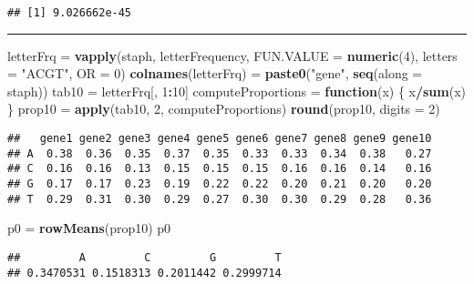 \documentclass[]{article}
\newenvironment{Shaded}{\begin{snugshade}}{\end{snugshade}}
\newcommand{\KeywordTok}[1]{\textcolor[rgb]{0.13,0.29,0.53}{\textbf{#1}}}
\newcommand{\DataTypeTok}[1]{\textcolor[rgb]{0.13,0.29,0.53}{#1}}
\newcommand{\DecValTok}[1]{\textcolor[rgb]{0.00,0.00,0.81}{#1}}
\newcommand{\StringTok}[1]{\textcolor[rgb]{0.31,0.60,0.02}{#1}}
\newcommand{\ControlFlowTok}[1]{\textcolor[rgb]{0.13,0.29,0.53}{\textbf{#1}}}
\newcommand{\OperatorTok}[1]{\textcolor[rgb]{0.81,0.36,0.00}{\textbf{#1}}}
\newcommand{\NormalTok}[1]{#1}
\begin{document}
\begin{verbatim}
## [1] 9.026662e-45
\end{verbatim}

\begin{center}\rule{0.5\linewidth}{\linethickness}\end{center}

\begin{Shaded}
\begin{Highlighting}[]
\NormalTok{letterFrq =}\StringTok{ }\KeywordTok{vapply}\NormalTok{(staph, letterFrequency, }\DataTypeTok{FUN.VALUE =} \KeywordTok{numeric}\NormalTok{(}\DecValTok{4}\NormalTok{),}
                   \DataTypeTok{letters =} \StringTok{"ACGT"}\NormalTok{, }\DataTypeTok{OR =} \DecValTok{0}\NormalTok{)}
\KeywordTok{colnames}\NormalTok{(letterFrq) =}\StringTok{ }\KeywordTok{paste0}\NormalTok{(}\StringTok{"gene"}\NormalTok{, }\KeywordTok{seq}\NormalTok{(}\DataTypeTok{along =}\NormalTok{ staph))}
\NormalTok{tab10 =}\StringTok{ }\NormalTok{letterFrq[, }\DecValTok{1}\OperatorTok{:}\DecValTok{10}\NormalTok{]}
\NormalTok{computeProportions =}\StringTok{ }\ControlFlowTok{function}\NormalTok{(x) \{ x}\OperatorTok{/}\KeywordTok{sum}\NormalTok{(x) \}}
\NormalTok{prop10 =}\StringTok{ }\KeywordTok{apply}\NormalTok{(tab10, }\DecValTok{2}\NormalTok{, computeProportions)}
\KeywordTok{round}\NormalTok{(prop10, }\DataTypeTok{digits =} \DecValTok{2}\NormalTok{)}
\end{Highlighting}
\end{Shaded}

\begin{verbatim}
##   gene1 gene2 gene3 gene4 gene5 gene6 gene7 gene8 gene9 gene10
## A  0.38  0.36  0.35  0.37  0.35  0.33  0.33  0.34  0.38   0.27
## C  0.16  0.16  0.13  0.15  0.15  0.15  0.16  0.16  0.14   0.16
## G  0.17  0.17  0.23  0.19  0.22  0.22  0.20  0.21  0.20   0.20
## T  0.29  0.31  0.30  0.29  0.27  0.30  0.30  0.29  0.28   0.36
\end{verbatim}

\begin{Shaded}
\begin{Highlighting}[]
\NormalTok{p0 =}\StringTok{ }\KeywordTok{rowMeans}\NormalTok{(prop10)}
\NormalTok{p0}
\end{Highlighting}
\end{Shaded}

\begin{verbatim}
##         A         C         G         T 
## 0.3470531 0.1518313 0.2011442 0.2999714
\end{verbatim}
\end{document}
